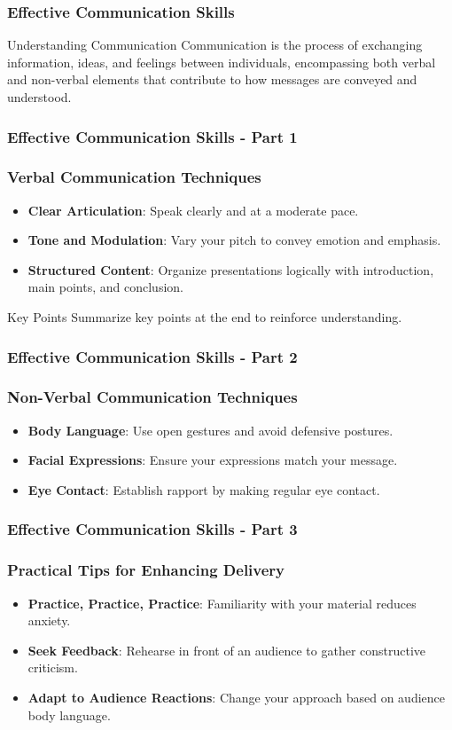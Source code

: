 \documentclass[aspectratio=169]{beamer}
\begin{document}
\begin{frame}[fragile]
    \frametitle{Effective Communication Skills}
    \begin{block}{Understanding Communication}
        Communication is the process of exchanging information, ideas, and feelings between individuals, encompassing both verbal and non-verbal elements that contribute to how messages are conveyed and understood.
    \end{block}
\end{frame}

\begin{frame}[fragile]
    \frametitle{Effective Communication Skills - Part 1}
    \frametitle{Verbal Communication Techniques}
    \begin{itemize}
        \item \textbf{Clear Articulation}: Speak clearly and at a moderate pace.
        \item \textbf{Tone and Modulation}: Vary your pitch to convey emotion and emphasis.
        \item \textbf{Structured Content}: Organize presentations logically with introduction, main points, and conclusion.
    \end{itemize}
    \begin{block}{Key Points}
        Summarize key points at the end to reinforce understanding.
    \end{block}
\end{frame}

\begin{frame}[fragile]
    \frametitle{Effective Communication Skills - Part 2}
    \frametitle{Non-Verbal Communication Techniques}
    \begin{itemize}
        \item \textbf{Body Language}: Use open gestures and avoid defensive postures.
        \item \textbf{Facial Expressions}: Ensure your expressions match your message.
        \item \textbf{Eye Contact}: Establish rapport by making regular eye contact.
    \end{itemize}
\end{frame}

\begin{frame}[fragile]
    \frametitle{Effective Communication Skills - Part 3}
    \frametitle{Practical Tips for Enhancing Delivery}
    \begin{itemize}
        \item \textbf{Practice, Practice, Practice}: Familiarity with your material reduces anxiety.
        \item \textbf{Seek Feedback}: Rehearse in front of an audience to gather constructive criticism.
        \item \textbf{Adapt to Audience Reactions}: Change your approach based on audience body language.
    \end{itemize}
\end{frame}
\end{document}
